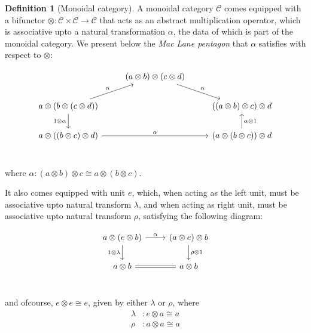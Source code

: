 \documentclass[10pt]{amsart}
\newcommand{\8}{\ensuremath{\infty}}
\newcommand{\0}{\ensuremath{\overset{\rightarrow}{0}}}
\newcommand{\1}{\ensuremath{\mathbf{1}}}
\newcommand{\C}{\ensuremath{\mathscr{C}}}
\theoremstyle{definition}
\newtheorem{definition}{Definition}[section]
\numberwithin{definition}{subsection}
\numberwithin{definition}{section}
\begin{document}
\begin{definition}[Monoidal category]
  A monoidal category $\C$ comes equipped with a bifunctor $\otimes : \C \times \C \rightarrow \C$ that acts as an abstract multiplication operator, which is associative upto a natural transformation $\alpha$, the data of which is part of the monoidal category. We present below the \emph{Mac Lane pentagon} that $\alpha$ satisfies with respect to $\otimes$:

  \begin{equation*}
    \begin{tikzcd}
      & (a \otimes b) \otimes (c \otimes d) \arrow[dr, "\alpha"] & \\
      a \otimes (b \otimes (c \otimes d)) \arrow[d, "1 \otimes \alpha"'] \arrow[ur, "\alpha"] & & ((a \otimes b) \otimes c) \otimes d \\
      a \otimes ((b \otimes c) \otimes d) \arrow[rr, "\alpha"] & & (a \otimes (b \otimes c)) \otimes d \arrow[u, "\alpha \otimes 1"'] \\
    \end{tikzcd}
  \end{equation*}

  where $\alpha : (a \otimes b) \otimes c \cong a \otimes (b \otimes c)$.

  It also comes equipped with unit $e$, which, when acting as the left unit, must be associative upto natural transform $\lambda$, and when acting as right unit, must be associative upto natural transform $\rho$, satisfying the following diagram:

  \begin{equation*}
    \begin{tikzcd}
      a \otimes (e \otimes b) \arrow[r, "\alpha"] \arrow[d, "1 \otimes \lambda"'] & (a \otimes e) \otimes b \arrow[d, "\rho \otimes 1"] \\
      a \otimes b \arrow[r, equal] & a \otimes b \\
    \end{tikzcd}
  \end{equation*}

  and ofcourse, $e \otimes e \cong e$, given by either $\lambda$ or $\rho$, where
  \begin{align*}
    \lambda & : e \otimes a \cong a \\
    \rho    & : a \otimes a \cong a \\
  \end{align*}
\end{definition}
\end{document}
